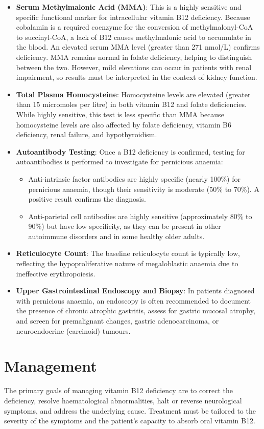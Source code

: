 \begin{itemize}
\begin{itemize}
    \end{itemize}
    \item \textbf{Serum Methylmalonic Acid (MMA)}: This is a highly sensitive and specific functional marker for intracellular vitamin B12 deficiency. Because cobalamin is a required coenzyme for the conversion of methylmalonyl-CoA to succinyl-CoA, a lack of B12 causes methylmalonic acid to accumulate in the blood. An elevated serum MMA level (greater than 271 nmol/L) confirms deficiency. MMA remains normal in folate deficiency, helping to distinguish between the two. However, mild elevations can occur in patients with renal impairment, so results must be interpreted in the context of kidney function.
    \item \textbf{Total Plasma Homocysteine}: Homocysteine levels are elevated (greater than 15 micromoles per litre) in both vitamin B12 and folate deficiencies. While highly sensitive, this test is less specific than MMA because homocysteine levels are also affected by folate deficiency, vitamin B6 deficiency, renal failure, and hypothyroidism.
    \item \textbf{Autoantibody Testing}: Once a B12 deficiency is confirmed, testing for autoantibodies is performed to investigate for pernicious anaemia:
    \begin{itemize}
        \item Anti-intrinsic factor antibodies are highly specific (nearly 100\%) for pernicious anaemia, though their sensitivity is moderate (50\% to 70\%). A positive result confirms the diagnosis.
        \item Anti-parietal cell antibodies are highly sensitive (approximately 80\% to 90\%) but have low specificity, as they can be present in other autoimmune disorders and in some healthy older adults.
    \end{itemize}
    \item \textbf{Reticulocyte Count}: The baseline reticulocyte count is typically low, reflecting the hypoproliferative nature of megaloblastic anaemia due to ineffective erythropoiesis.
    \item \textbf{Upper Gastrointestinal Endoscopy and Biopsy}: In patients diagnosed with pernicious anaemia, an endoscopy is often recommended to document the presence of chronic atrophic gastritis, assess for gastric mucosal atrophy, and screen for premalignant changes, gastric adenocarcinoma, or neuroendocrine (carcinoid) tumours.
\end{itemize}

\section*{Management}
The primary goals of managing vitamin B12 deficiency are to correct the deficiency, resolve haematological abnormalities, halt or reverse neurological symptoms, and address the underlying cause. Treatment must be tailored to the severity of the symptoms and the patient's capacity to absorb oral vitamin B12.

